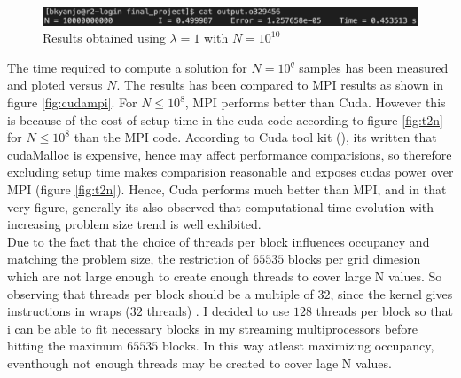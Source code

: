 \documentclass[12pt,a4paper]{article}
\begin{document}
\begin{figure}[H]
	\centering
	\includegraphics[width=0.7\linewidth]{t2}
	\caption{Results obtained using $\lambda = 1$  with  $N= 10^{10}$ }
	\label{fig:t2}
\end{figure}

\noindent The time required to compute a solution for $N=10^{q}$ samples has been measured and ploted versus $N$. The results has been compared to MPI results as shown in figure \ref{fig:cudampi}.  For $N \le 10^{8} $, MPI performs better than Cuda. However this is because 
of the cost of setup time in the cuda code  according to figure \ref{fig:t2n} for $N \le 10^{8}$ than the MPI code. According to Cuda tool kit  (\cite{cuda}), its written that cudaMalloc is expensive, hence may affect performance comparisions, so therefore excluding setup time makes comparision reasonable and exposes cudas power over MPI (figure \ref{fig:t2n}). Hence, Cuda performs much better than MPI, and in that very figure, generally its also observed that computational time evolution with increasing problem size trend is well exhibited.\\

\noindent Due to the fact that the choice of threads per block influences occupancy and matching the problem size, the restriction of $65535$ blocks per grid dimesion which are not large enough to create enough threads to cover large N values. So observing that threads per block should be a multiple of $32$,  since the kernel gives instructions in wraps ($32$ threads) \cite{10.5555/2430671}. I decided to use $128$ threads per block so that i can be able to fit necessary blocks in my streaming multiprocessors before hitting the maximum  $65535$ blocks. In this way atleast maximizing occupancy, eventhough not enough threads may be created to cover lage N values.
\end{document}
